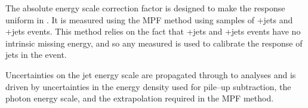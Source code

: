 
The absolute energy scale correction factor is designed to
make the response uniform in \pT. It is measured using the \ac{MPF} method \cite{cms-jec-2011}
 using samples of \Pphoton+jets and \PZ+jets events. This method relies on the fact that \Pphoton+jets
and \PZ+jets events have no intrinsic missing energy, and so any measured \MET
is used to calibrate the \pT response of jets in the event.

Uncertainties on the jet energy scale are propagated through to analyses
and is driven by uncertainties in the energy density used for pile--up
subtraction, the photon energy scale, and the extrapolation required in the
\ac{MPF} method.




